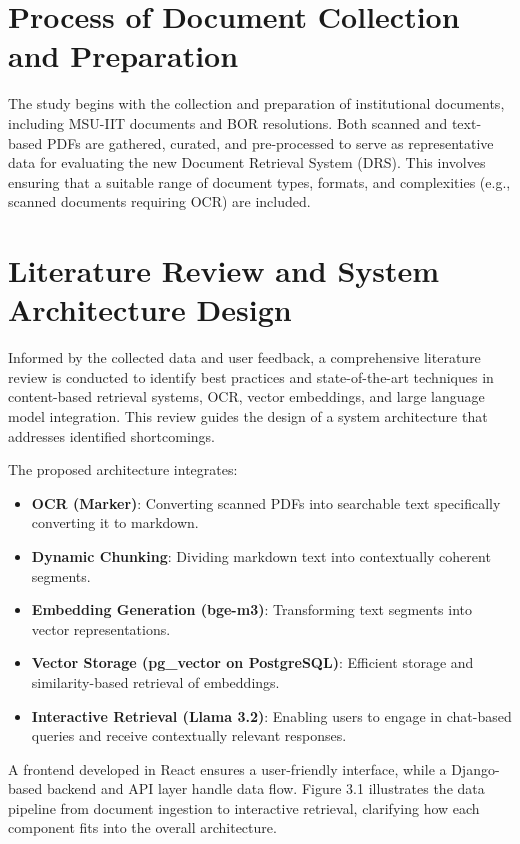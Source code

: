 \section{Process of Document Collection and Preparation}

\noindent The study begins with the collection and preparation of institutional documents, including MSU-IIT documents and BOR resolutions. Both scanned and text-based PDFs are gathered, curated, and pre-processed to serve as representative data for evaluating the new Document Retrieval System (DRS). This involves ensuring that a suitable range of document types, formats, and complexities (e.g., scanned documents requiring OCR) are included.

\section{Literature Review and System Architecture Design}

\noindent Informed by the collected data and user feedback, a comprehensive literature review is conducted to identify best practices and state-of-the-art techniques in content-based retrieval systems, OCR, vector embeddings, and large language model integration. This review guides the design of a system architecture that addresses identified shortcomings.

The proposed architecture integrates:

\begin{itemize}
    \item \textbf{OCR (Marker)}: Converting scanned PDFs into searchable text specifically converting it to markdown.
    \item \textbf{Dynamic Chunking}: Dividing markdown text into contextually coherent segments.
    \item \textbf{Embedding Generation (bge-m3)}: Transforming text segments into vector representations.
    \item \textbf{Vector Storage (pg\_vector on PostgreSQL)}: Efficient storage and similarity-based retrieval of embeddings.
    \item \textbf{Interactive Retrieval (Llama 3.2)}: Enabling users to engage in chat-based queries and receive contextually relevant responses.
\end{itemize}

\noindent A frontend developed in React ensures a user-friendly interface, while a Django-based backend and API layer handle data flow. Figure 3.1 illustrates the data pipeline from document ingestion to interactive retrieval, clarifying how each component fits into the overall architecture.

